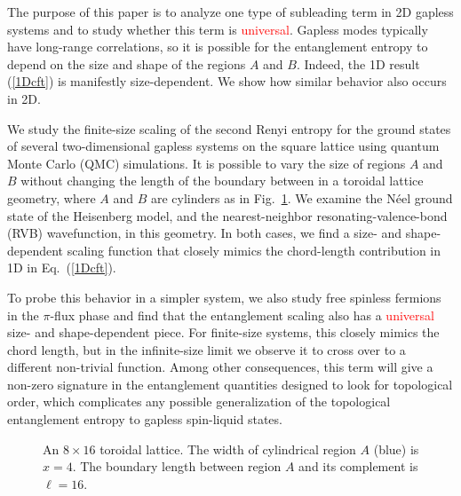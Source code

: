 \documentclass[prb,aps,twocolumn,floatfix,amsmath,amssymb,superscriptaddress,tightenlines]{revtex4}
\begin{document}
The purpose of this
paper is to analyze one type of subleading term in 2D gapless systems
and to study whether this term is \textcolor{red}{universal}. Gapless modes typically have long-range correlations, so it is possible for
the entanglement entropy to depend on the size and shape of the
regions $A$ and $B$. Indeed, the 1D result
(\ref{1Dcft}) is manifestly size-dependent. We show how similar behavior also occurs in 2D.

We study the finite-size scaling of the second Renyi entropy for
the ground states of several two-dimensional gapless systems on the square lattice using quantum Monte Carlo (QMC) simulations. It is possible to vary the size of regions $A$ and $B$ without changing the length of the boundary between in a toroidal lattice geometry, where $A$ and $B$ are cylinders as in Fig.\ \ref{fig:torus}. 
We examine the N\'eel ground state of the Heisenberg model, and the nearest-neighbor resonating-valence-bond (RVB) wavefunction, in this geometry.
In both cases, we find a size- and shape-dependent scaling function that closely mimics the chord-length contribution in 1D in Eq.~(\ref{1Dcft}).

To probe this behavior in a simpler system, we also study
 free spinless fermions in the $\pi$-flux phase and find that the
 entanglement scaling also has a \textcolor{red}{universal} size- and shape-dependent piece.
For finite-size systems, this closely mimics the chord length, but in the infinite-size limit we observe it to cross over to a different non-trivial function.
Among other consequences, this term will give a non-zero signature in the entanglement quantities \cite{KP,LW} designed to look for topological order, which complicates any possible generalization of the topological entanglement entropy to gapless spin-liquid states. 
 
  \begin{figure}
   \begin{center}
   \end{center}
   \caption{An $8 \times 16$ toroidal lattice.  The width of cylindrical region $A$ (blue) is $x=4$.  The boundary length between region $A$ and its complement is $\ell = 16$. }
   \label{fig:torus}
 \end{figure}
 
\end{document}
